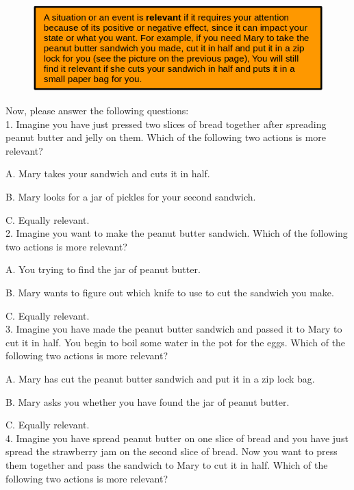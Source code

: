\documentclass[12pt]{report}
\begin{document}
\begin{appendices}
\begin{figure}[tbh]
 \centering
 \includegraphics[width=1\textwidth]{figure/relevance-definition.png}
\end{figure}

Now, please answer the following questions:\\

1. Imagine you have just pressed two slices of bread together after spreading peanut butter and jelly on them. Which of the following two actions is more relevant?

A. Mary takes your sandwich and cuts it in half.

B. Mary looks for a jar of pickles for your second sandwich.

C. Equally relevant.\\


2. Imagine you want to make the peanut butter sandwich. Which of the following two actions is more relevant?

A. You trying to find the jar of peanut butter.

B. Mary wants to figure out which knife to use to cut the sandwich you make.

C. Equally relevant.\\


3. Imagine you have made the peanut butter sandwich and passed it to Mary to cut it in half. You begin to boil some water in the pot for the eggs. Which of the following two actions is more relevant? 

A. Mary has cut the peanut butter sandwich and put it in a zip lock bag.

B. Mary asks you whether you have found the jar of peanut butter.

C. Equally relevant.\\


4. Imagine you have spread peanut butter on one slice of bread and you have just spread the strawberry jam on the second slice of bread. Now you want to press them together and pass the sandwich to Mary to cut it in half. Which of the following two actions is more relevant? 


\end{appendices}
\end{document}
